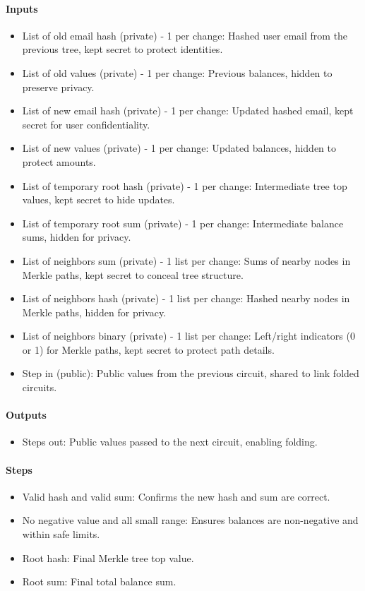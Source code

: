 \paragraph{Inputs}
\begin{itemize}
   \item List of old email hash (private) - 1 per change: Hashed user email from the previous tree, kept secret to protect identities.
   \item List of old values (private) - 1 per change: Previous balances, hidden to preserve privacy.
   \item List of new email hash (private) - 1 per change: Updated hashed email, kept secret for user confidentiality.
   \item List of new values (private) - 1 per change: Updated balances, hidden to protect amounts.
   \item List of temporary root hash (private) - 1 per change: Intermediate tree top values, kept secret to hide updates.
   \item List of temporary root sum (private) - 1 per change: Intermediate balance sums, hidden for privacy.
   \item List of neighbors sum (private) - 1 list per change: Sums of nearby nodes in Merkle paths, kept secret to conceal tree structure.
   \item List of neighbors hash (private) - 1 list per change: Hashed nearby nodes in Merkle paths, hidden for privacy.
   \item List of neighbors binary (private) - 1 list per change: Left/right indicators (0 or 1) for Merkle paths, kept secret to protect path details.
   \item Step in (public): Public values from the previous circuit, shared to link folded circuits.
   \end{itemize}

\paragraph{Outputs}
\begin{itemize}
   \item Steps out: Public values passed to the next circuit, enabling folding.
   \end{itemize}

\paragraph{Steps}
\begin{itemize}
   \item Valid hash and valid sum: Confirms the new hash and sum are correct.
   \item No negative value and all small range: Ensures balances are non-negative and within safe limits.
   \item Root hash: Final Merkle tree top value.
   \item Root sum: Final total balance sum.
   \end{itemize}


